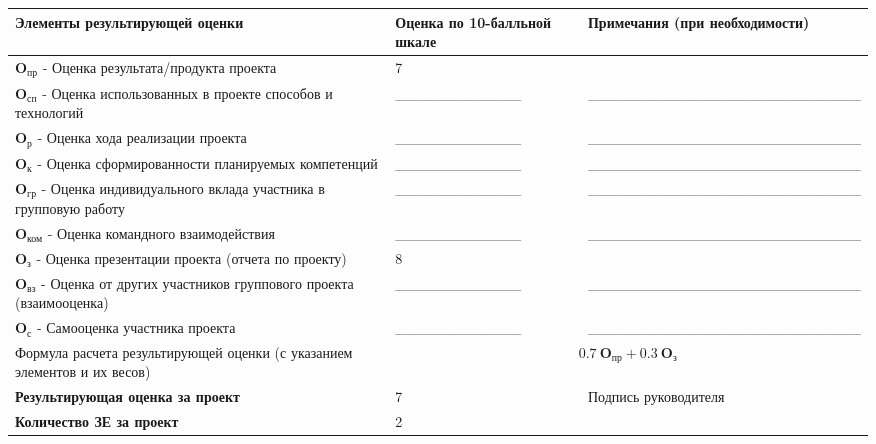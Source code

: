 \documentclass[10pt]{article}
\begin{document}
\vspace{-0.95cm}
\begin{table*}[h!]
	\centering
	\begin{tabular}{|m{}<{\centering}|m{}<{\centering}|m{}<{\centering}|}
	\noalign{\smallskip}
	\hline
	Элементы результирующей оценки\footnotemark  & Оценка по 10-балльной шкале & Примечания (при необходимости) \\
	\hline 
	{\bf $\mathbf{O_{\text{пр}}}$ } - Оценка результата/продукта проекта & 7 &  \\
	\hline 
	{\bf $\mathbf{O_{\text{сп}}}$ } - Оценка использованных в проекте способов и технологий & \_\_\_\_\_\_\_\_\_\_\_\_ & \_\_\_\_\_\_\_\_\_\_\_\_\_\_\_\_\_\_\_\_\_\_\_\_\_\_\\
	\hline 
	{\bf $\mathbf{O_{\text{р}}}$ } - Оценка хода реализации проекта & \_\_\_\_\_\_\_\_\_\_\_\_ & \_\_\_\_\_\_\_\_\_\_\_\_\_\_\_\_\_\_\_\_\_\_\_\_\_\_\\
	\hline 
	{\bf $\mathbf{O_{\text{к}}}$ } - Оценка сформированности планируемых компетенций & \_\_\_\_\_\_\_\_\_\_\_\_ & \_\_\_\_\_\_\_\_\_\_\_\_\_\_\_\_\_\_\_\_\_\_\_\_\_\_\\
	\hline 
	{\bf $\mathbf{O_{\text{гр}}}$ } - Оценка индивидуального вклада участника в групповую работу & \_\_\_\_\_\_\_\_\_\_\_\_ & \_\_\_\_\_\_\_\_\_\_\_\_\_\_\_\_\_\_\_\_\_\_\_\_\_\_\\
	\hline 
	{\bf $\mathbf{O_{\text{ком}}}$ } - Оценка командного взаимодействия & \_\_\_\_\_\_\_\_\_\_\_\_ & \_\_\_\_\_\_\_\_\_\_\_\_\_\_\_\_\_\_\_\_\_\_\_\_\_\_\\
	\hline 
	{\bf $\mathbf{O_{\text{з}}}$ } - Оценка презентации проекта (отчета по проекту) & 8 &  \\
	\hline 
	{\bf $\mathbf{O_{\text{вз}}}$ } - Оценка от других участников группового проекта (взаимооценка) & \_\_\_\_\_\_\_\_\_\_\_\_ & \_\_\_\_\_\_\_\_\_\_\_\_\_\_\_\_\_\_\_\_\_\_\_\_\_\_\\
	\hline  
	{\bf $\mathbf{O_{\text{с}}}$ } - Самооценка участника проекта & \_\_\_\_\_\_\_\_\_\_\_\_ & \_\_\_\_\_\_\_\_\_\_\_\_\_\_\_\_\_\_\_\_\_\_\_\_\_\_\\
	\hline
	
	Формула расчета результирующей оценки (с указанием элементов и их весов)  & \multicolumn{2}{c|}{$0.7~\mathbf{O_{\text{пр}}} + 0.3~\mathbf{O_{\text{з}}}$} \\
	
	\hline
	{\bf Результирующая оценка за проект} & 7 & \multirow{2}{*}{Подпись руководителя}\\
	\cline{1-2}
	{\bf Количество ЗЕ за проект} & 2 & 
	\\
	
	\hline
	
	
	\end{tabular}
\end{table*}
\end{document}
